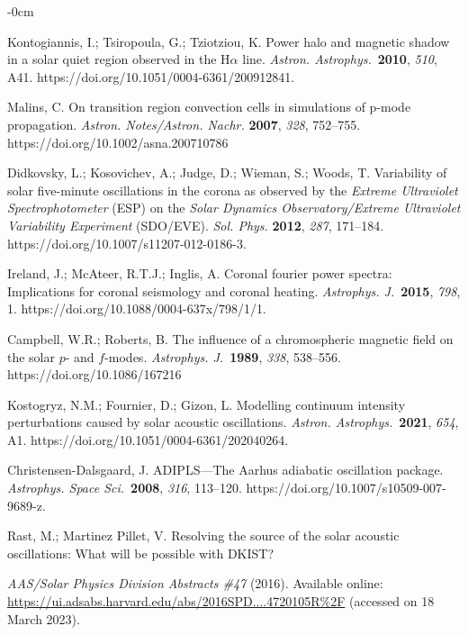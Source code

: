 \documentclass[physics,article,accept,pdftex,moreauthors]{Definitions/mdpi}
\newcommand{\aap}{{\it Astron. Astrophys.}}
\newcommand{\apj}{{\it Astrophys. J.}}
\newcommand{\apss}{{\it Astrophys. Space Sci.}}
\begin{document}
\begin{adjustwidth}{-\extralength}{0cm}
\begin{thebibliography}{999}
		Kontogiannis, I.; Tsiropoula, G.; Tziotziou, K. Power halo and magnetic shadow in a solar quiet region observed in the H$\alpha$
 line. \aap~\textbf{2010}, \emph{510}, A41. https://doi.org/10.1051/0004-6361/200912841.
		
		{Malins}, C. {On transition region convection cells in simulations of
 {p}-mode propagation}. \emph{{Astron. Notes/Astron. Nachr.}} \textbf{2007}, \emph{328}, 752--755.
 {https://doi.org/10.1002/asna.200710786}		

		 Didkovsky, L.; Kosovichev, A.; Judge, D.; Wieman, S.; Woods, T. 
Variability of solar five-minute oscillations in the corona as observed by {the} 
 \emph{Extreme Ultraviolet Spectrophotometer} %
(ESP) on the 
\emph{Solar 
Dynamics Observatory/Extreme Ultraviolet Variability Experiment} (SDO/EVE). \emph{Sol. Phys.} \textbf{2012}, \emph{287}, 171--184. 
https://doi.org/10.1007/s11207-012-0186-3.
		
		
		Ireland, J.; McAteer, R.T.J.; Inglis, A. Coronal fourier power spectra: 
Implications for coronal seismology and coronal heating. \apj~\textbf{2015}, \emph{798}, 1. https://doi.org/10.1088/0004-637x/798/1/1.
		
		
		
		Campbell, W.R.; Roberts, B. The influence of a chromospheric magnetic field on the solar 
 {$p$}- and {$f$}-modes. \apj~\textbf{1989}, \emph{338}, 538--556. 
 {https://doi.org/10.1086/167216} 
		
		 Kostogryz, N.M.; Fournier, D.; Gizon, L. Modelling continuum intensity perturbations caused by solar acoustic oscillations. \aap~\textbf{2021}, \emph{654}, A1. https://doi.org/10.1051/0004-6361/202040264.
		
		
		 Christensen-Dalsgaard, J. ADIPLS---The Aarhus adiabatic oscillation package. \apss~\textbf{2008}, \emph{316}, 113--120. https://doi.org/10.1007/s10509-007-9689-z.
		
		
		 Rast, M.; Martinez Pillet, V. {Resolving the source of the solar 
acoustic oscillations: What will be possible with DKIST?} {\emph{AAS/Solar Physics Division Abstracts \#47} (2016).
 {Available online:} \url{https://ui.adsabs.harvard.edu/abs/2016SPD....4720105R%2F} (accessed on 18 March 2023). 
		
}
\end{thebibliography}
\end{adjustwidth}
\end{document}
